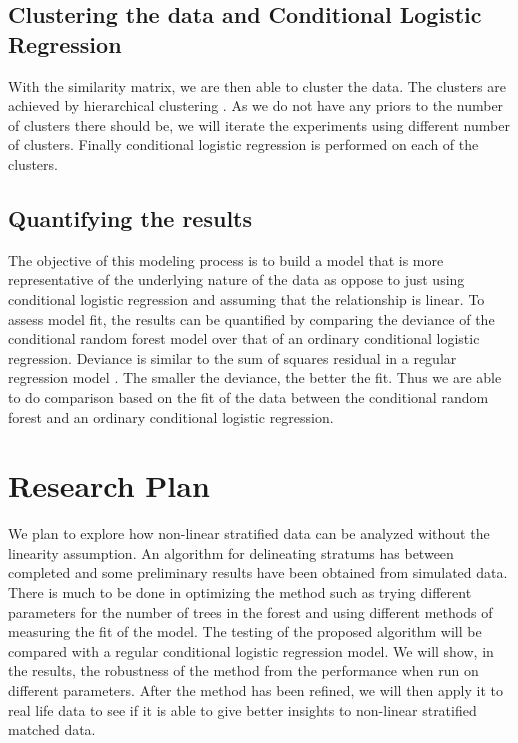 \subsection{Clustering the data and Conditional Logistic Regression}
With the similarity matrix, we are then able to cluster the data. The clusters are achieved by hierarchical clustering \citep{Johnson67}. As we do not have any priors to the number of clusters there should be, we will iterate the experiments using different number of clusters. Finally conditional logistic regression is performed on each of the clusters.

\subsection{Quantifying the results}
The objective of this modeling process is to build a model that is more representative of the underlying nature of the data as oppose to just using conditional logistic regression and assuming that the relationship is linear. To assess model fit, the results can be quantified by comparing the deviance of the conditional random forest model over that of an ordinary conditional logistic regression. Deviance is similar to the sum of squares residual in a regular regression model \citep{pdSAS99}. The smaller the deviance, the better the fit. Thus we are able to do comparison based on the fit of the data between the conditional random forest and an ordinary conditional logistic regression.

\section{Research Plan}
We plan to explore how non-linear stratified data can be analyzed without the linearity assumption. An algorithm for delineating stratums has between completed and some preliminary results have been obtained from simulated data. There is much to be done in optimizing the method such as trying different parameters for the number of trees in the forest and using different methods of measuring the fit of the model. The testing of the proposed algorithm will be compared with a regular conditional logistic regression model. We will show, in the results, the robustness of the method from the performance when run on different parameters. After the method has been refined, we will then apply it to real life data to see if it is able to give better insights to non-linear stratified matched data. 


